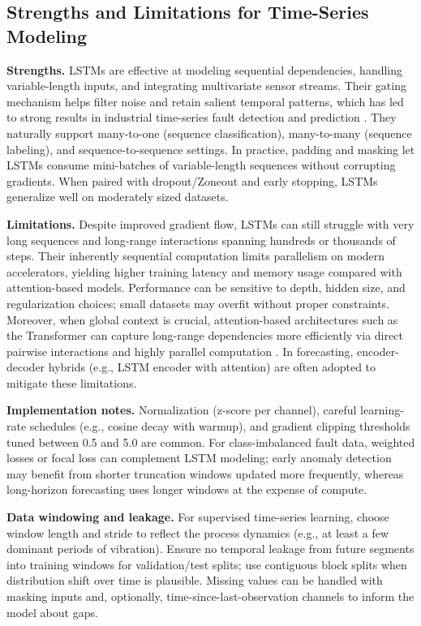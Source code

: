 \subsection{Strengths and Limitations for Time-Series Modeling}
\textbf{Strengths.} LSTMs are effective at modeling sequential dependencies, handling variable-length inputs, and integrating multivariate sensor streams. Their gating mechanism helps filter noise and retain salient temporal patterns, which has led to strong results in industrial time-series fault detection and prediction \cite{filonov2016multivariateindustrialtimeseries, zhao2019deep}. They naturally support many-to-one (sequence classification), many-to-many (sequence labeling), and sequence-to-sequence settings. In practice, padding and masking let LSTMs consume mini-batches of variable-length sequences without corrupting gradients. When paired with dropout/Zoneout and early stopping, LSTMs generalize well on moderately sized datasets.

\textbf{Limitations.} Despite improved gradient flow, LSTMs can still struggle with very long sequences and long-range interactions spanning hundreds or thousands of steps. Their inherently sequential computation limits parallelism on modern accelerators, yielding higher training latency and memory usage compared with attention-based models. Performance can be sensitive to depth, hidden size, and regularization choices; small datasets may overfit without proper constraints. Moreover, when global context is crucial, attention-based architectures such as the Transformer can capture long-range dependencies more efficiently via direct pairwise interactions and highly parallel computation \cite{pascanu2013difficulty, vaswani2017attention}. In forecasting, encoder-decoder hybrids (e.g., LSTM encoder with attention) are often adopted to mitigate these limitations.

\textbf{Implementation notes.} Normalization (z-score per channel), careful learning-rate schedules (e.g., cosine decay with warmup), and gradient clipping thresholds tuned between 0.5 and 5.0 are common. For class-imbalanced fault data, weighted losses or focal loss can complement LSTM modeling; early anomaly detection may benefit from shorter truncation windows updated more frequently, whereas long-horizon forecasting uses longer windows at the expense of compute.

\textbf{Data windowing and leakage.} For supervised time-series learning, choose window length and stride to reflect the process dynamics (e.g., at least a few dominant periods of vibration). Ensure no temporal leakage from future segments into training windows for validation/test splits; use contiguous block splits when distribution shift over time is plausible. Missing values can be handled with masking inputs and, optionally, time-since-last-observation channels to inform the model about gaps.

